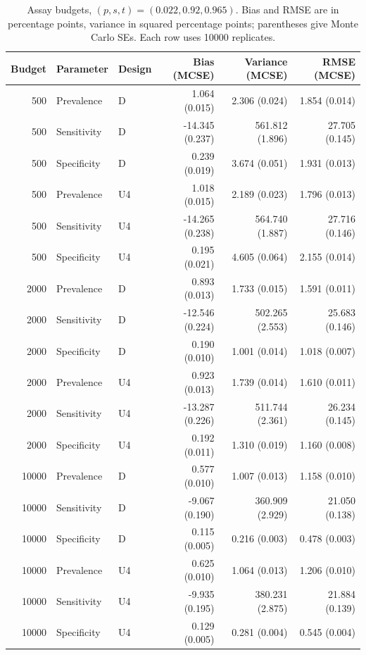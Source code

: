\documentclass[11pt]{article}
\begin{document}
\begin{table}[!htbp]\centering\scriptsize
\caption{Assay budgets, $(p,s,t)=(0.022,0.92,0.965)$. Bias and RMSE are in percentage points, variance in squared percentage points; parentheses give Monte Carlo SEs. Each row uses 10000 replicates.}\label{tab:bias-low-full}
\begin{tabular}{rllrrr}\toprule
Budget & Parameter & Design & Bias (MCSE) & Variance (MCSE) & RMSE (MCSE)\\\midrule
500 & Prevalence & D & 1.064 (0.015) & 2.306 (0.024) & 1.854 (0.014) \\
500 & Sensitivity & D & -14.345 (0.237) & 561.812 (1.896) & 27.705 (0.145) \\
500 & Specificity & D & 0.239 (0.019) & 3.674 (0.051) & 1.931 (0.013) \\
500 & Prevalence & U4 & 1.018 (0.015) & 2.189 (0.023) & 1.796 (0.013) \\
500 & Sensitivity & U4 & -14.265 (0.238) & 564.740 (1.887) & 27.716 (0.146) \\
500 & Specificity & U4 & 0.195 (0.021) & 4.605 (0.064) & 2.155 (0.014) \\
2000 & Prevalence & D & 0.893 (0.013) & 1.733 (0.015) & 1.591 (0.011) \\
2000 & Sensitivity & D & -12.546 (0.224) & 502.265 (2.553) & 25.683 (0.146) \\
2000 & Specificity & D & 0.190 (0.010) & 1.001 (0.014) & 1.018 (0.007) \\
2000 & Prevalence & U4 & 0.923 (0.013) & 1.739 (0.014) & 1.610 (0.011) \\
2000 & Sensitivity & U4 & -13.287 (0.226) & 511.744 (2.361) & 26.234 (0.145) \\
2000 & Specificity & U4 & 0.192 (0.011) & 1.310 (0.019) & 1.160 (0.008) \\
10000 & Prevalence & D & 0.577 (0.010) & 1.007 (0.013) & 1.158 (0.010) \\
10000 & Sensitivity & D & -9.067 (0.190) & 360.909 (2.929) & 21.050 (0.138) \\
10000 & Specificity & D & 0.115 (0.005) & 0.216 (0.003) & 0.478 (0.003) \\
10000 & Prevalence & U4 & 0.625 (0.010) & 1.064 (0.013) & 1.206 (0.010) \\
10000 & Sensitivity & U4 & -9.935 (0.195) & 380.231 (2.875) & 21.884 (0.139) \\
10000 & Specificity & U4 & 0.129 (0.005) & 0.281 (0.004) & 0.545 (0.004) \\

\bottomrule\end{tabular}\end{table}
\end{document}
